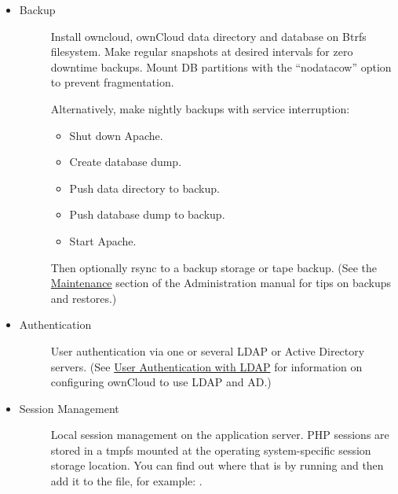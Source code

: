 \documentclass[letterpaper,10pt,english]{sphinxmanual}
\begin{document}
\begin{itemize}
\item {} \begin{description}
\item[{Backup}] \leavevmode
Install owncloud, ownCloud data directory and database on Btrfs filesystem.
Make regular snapshots at desired intervals for zero downtime backups.
Mount DB partitions with the ``nodatacow'' option to prevent fragmentation.

Alternatively, make nightly backups with service interruption:
\begin{itemize}
\item {} 
Shut down Apache.

\item {} 
Create database dump.

\item {} 
Push data directory to backup.

\item {} 
Push database dump to backup.

\item {} 
Start Apache.

\end{itemize}

Then optionally rsync to a backup storage or tape backup. (See the
\href{https://doc.owncloud.org/server/9.0/admin\_manual/maintenance/index.html}{Maintenance} section of the Administration manual for tips on backups
and restores.)

\end{description}

\item {} \begin{description}
\item[{Authentication}] \leavevmode
User authentication via one or several LDAP or Active Directory servers. (See
\href{https://doc.owncloud.org/server/9.0/admin\_manual/configuration\_user/user\_auth\_ldap.html}{User Authentication with LDAP} for information on configuring ownCloud to
use LDAP and AD.)

\end{description}

\item {} \begin{description}
\item[{Session Management}] \leavevmode
Local session management on the application server. PHP sessions are stored
in a tmpfs mounted at the operating system-specific session storage
location. You can find out where that is by running  and then add it to the  file,
for example:
.


\end{description}
\end{itemize}
\end{document}
